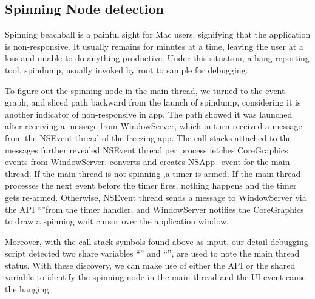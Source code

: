 \subsection{Spinning Node detection}

Spinning beachball is a painful sight for Mac users, signifying that the
application is non-responsive. It usually remains for minutes at a time, leaving
the user at a loss and unable to do anything productive. Under this situation, a
hang reporting tool, spindump, usually invoked by root to sample for debugging.

To figure out the spinning node in the main thread, we turned to the event
graph, and sliced path backward from the launch of spindump, considering it is
another indicator of non-responsive in app. The path showed it was launched
after receiving a message from WindowServer, which in turn received a message
from the NSEvent thread of the freezing app. The call stacks attached to the
messages further revealed NSEvent thread per process fetches CoreGraphics events
from WindowServer, converts and creates NSApp\_event for the main thread. If the
main thread is not spinning ,a timer is armed. If the main thread processes
the next event before the timer fires, nothing happens and the timer gets
re-armed. Otherwise, NSEvent thread sends a message to WindowServer via the
API ``''from the timer handler, and WindowServer
notifies the CoreGraphics to draw a spinning wait cursor over the application
window.

Moreover, with the call stack symbols found above as input, our detail debugging
script detected two share variables ``'' and
``'', are used to note the main thread status. With
these discovery, we can make use of either the API or the shared variable to
identify the spinning node in the main thread and the UI event cause the hanging.
